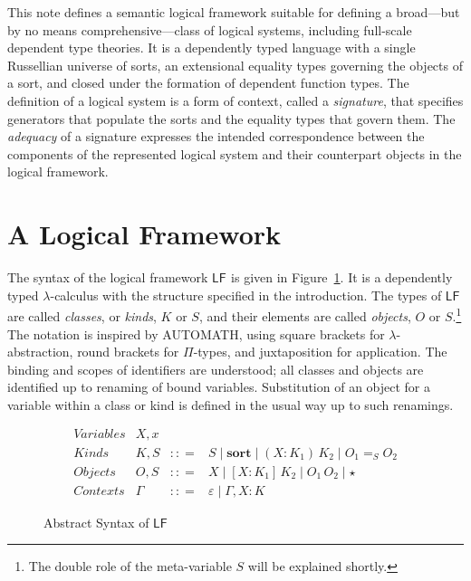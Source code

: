 \documentclass[11pt,twoside]{article}
\newcommand{\LF}[1][]{\ensuremath{\mathsf{LF}_{#1}}}
\newcommand{\bnfdef}{\mathrel{{:}{:}{=}}}
\newcommand{\bnfalt}{\mathrel{\mid}}
\newcommand{\sortclass}{\ensuremath{\textbf{sort}}}
\newcommand{\eqclass}[3]{{#2}=_{#1}{#3}}
\newcommand{\piclass}[3]{({#2}\mathbin{:}{#1})\,{#3}}
\newcommand{\lamobj}[3]{[{#2}\mathbin{:}{#1}]\,{#3}}
\newcommand{\appobj}[2]{{#1}\,{#2}}
\newcommand{\reflobj}{\star}
\newcommand{\empctx}{\varepsilon}
\newcommand{\snocctx}[3]{{#1}\mathbin{,}{#2}{:}{#3}}
\begin{document}
This note defines a semantic logical framework suitable for defining a broad---but by no
means comprehensive---class of logical systems, including full-scale dependent type
theories.  It is a dependently typed language with a single Russellian universe of sorts,
an extensional equality types governing the objects of a sort, and closed under the
formation of dependent function types.  The definition of a logical system is a form of
context, called a \emph{signature}, that specifies generators that populate the sorts and
the equality types that govern them.  The \emph{adequacy} of a signature expresses the
intended correspondence between the components of the represented logical system and their
counterpart objects in the logical framework.

\section{A Logical Framework}

The syntax of the logical framework \LF{} is given in Figure~\ref{fig:lf-syntax}.  It is a
dependently typed $\lambda$-calculus with the structure specified in the introduction.  The
types of \LF{} are called \emph{classes}, or \emph{kinds}, $K$ or $S$, and their elements
are called \emph{objects}, $O$ or $S$.\footnote{The double role of the meta-variable $S$
  will be explained shortly.}  The notation is inspired by \textsf{AUTOMATH}, using square
brackets for $\lambda$-abstraction, round brackets for $\Pi$-types, and juxtaposition for
application.  The binding and scopes of identifiers are understood; all classes and
objects are identified up to renaming of bound variables.  Substitution of an object for a
variable within a class or kind is defined in the usual way up to such renamings.

\begin{figure}[tp]
  
  \begin{displaymath}
    \begin{array}{lrcl}
      \textit{Variables} & X,x \\
      \textit{Kinds} & K, S & \bnfdef{} & S \bnfalt \sortclass \bnfalt \piclass{K_{1}}{X}{K_{2}}
                                          \bnfalt \eqclass{S}{O_{1}}{O_{2}} \\
      \textit{Objects} & O, S & \bnfdef & X \bnfalt \lamobj{K_{1}}{X}{K_{2}} \bnfalt
                                          \appobj{O_{1}}{O_{2}} \bnfalt \reflobj{} \\
      \textit{Contexts} & \Gamma & \bnfdef & \empctx{} \bnfalt \snocctx{\Gamma}{X}{K}
    \end{array}
  \end{displaymath}

  \caption{Abstract Syntax of \LF{}}
  \label{fig:lf-syntax}
\end{figure}
\end{document}
